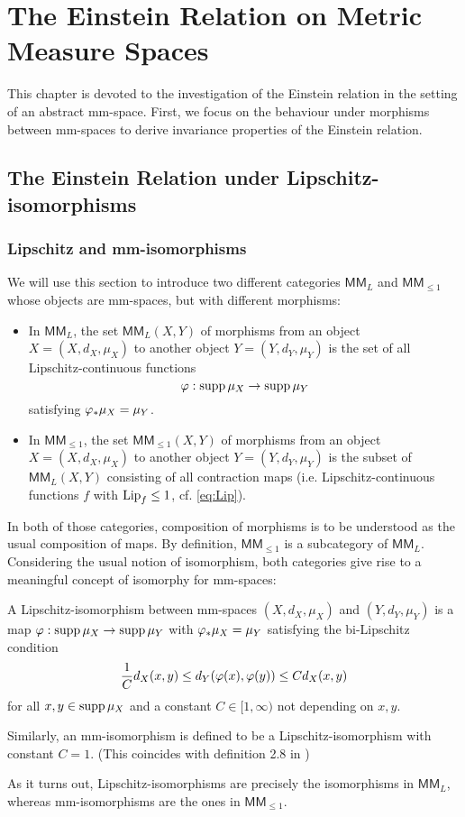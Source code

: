 \chapter{The Einstein Relation on Metric Measure Spaces}

This chapter is devoted to the investigation of the Einstein relation in the setting of an abstract mm-space. First, we focus on the behaviour under morphisms between mm-spaces to derive invariance properties of the Einstein relation. 

\section{The Einstein Relation under Lipschitz-isomorphisms}

\subsection{Lipschitz and mm-isomorphisms}

We will use this section to introduce two different categories $\mathsf{MM}_L$ and $\mathsf{MM}_{\leq1}$ whose objects are mm-spaces, but with different morphisms: 
\begin{itemize}
  \item In $\mathsf{MM}_L$, the set $\mathsf{MM}_L(X,Y)$ of morphisms from an object $X=(X,d_X,\mu_X)$ to another object $Y=(Y,d_Y,\mu_Y)$ is the set of all Lipschitz-continuous functions 
  \[ 
    \varphi:\operatorname{supp}\mu_X\to\operatorname{supp}\mu_Y
  \]
  satisfying $\varphi_*\mu_X=\mu_Y$.
  \item In $\mathsf{MM}_{\leq1}$, the set $\mathsf{MM}_{\leq1}(X,Y)$ of morphisms from an object $X=(X,d_X,\mu_X)$ to another object $Y=(Y,d_Y,\mu_Y)$ is the subset of $\mathsf{MM}_L(X,Y)$ consisting of all contraction maps (i.e. Lipschitz-continuous functions $f$ with $\operatorname{Lip}_f\leq1$, cf. \eqref{eq:Lip}).
\end{itemize}
In both of those categories, composition of morphisms is to be understood as the usual composition of maps. By definition, $\mathsf{MM}_{\leq1}$ is a subcategory of $\mathsf{MM}_L$. Considering the usual notion of isomorphism, both categories give rise to a meaningful concept of isomorphy for mm-spaces: 
\begin{defin}
  A Lipschitz-isomorphism between mm-spaces $(X,d_X,\mu_X)$ and $(Y,d_Y,\mu_Y)$ is a map 
  $\varphi:\operatorname{supp}\mu_X\to\operatorname{supp}\mu_Y$ with $\varphi_*\mu_X=\mu_Y$ satisfying the bi-Lipschitz condition
  \[
    \frac{1}{C}d_X(x,y)\leq d_Y(\varphi(x),\varphi(y))\leq Cd_X(x,y)
  \]
  for all $x,y\in\operatorname{supp}\mu_X$ and a constant $C\in[1,\infty)$ not depending on $x,y$.
  
  Similarly, an mm-isomorphism is defined to be a Lipschitz-isomorphism with constant $C=1$. (This coincides with definition 2.8 in \cite{shioya2016metric})
\end{defin}
As it turns out, Lipschitz-isomorphisms are precisely the isomorphisms in $\mathsf{MM}_L$, whereas mm-isomorphisms are the ones in $\mathsf{MM}_{\leq1}$.

